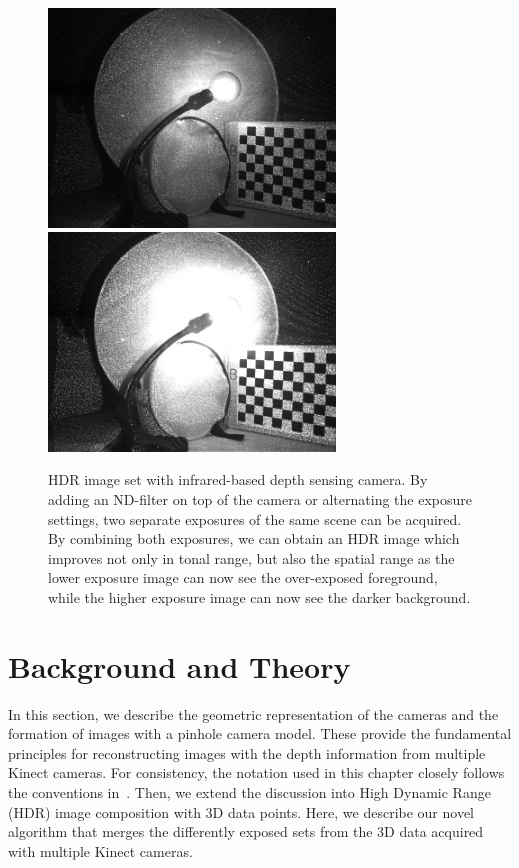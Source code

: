 \begin{figure}
\centering
\includegraphics[width=3.0in]{ch4/diagrams/low_expo_light.jpg} 
\includegraphics[width=3.0in]{ch4/diagrams/high_expo_light.jpg} \\
\caption{HDR image set with infrared-based depth sensing camera. By adding an ND-filter on top of the camera or alternating the exposure settings, two separate exposures of the same scene can be acquired. By combining both exposures, we can obtain an HDR image which improves not only in tonal range, but also the spatial range as the lower exposure image can now see the over-exposed foreground, while the higher exposure image can now see the darker background.}
\label{fig:ir_hdr}
\end{figure}

\section{Background and Theory}
In this section, we describe the geometric representation of the cameras and the formation of images with a pinhole camera model. These provide the fundamental principles for reconstructing images with the depth information from multiple Kinect cameras.  For consistency, the notation used in this chapter closely follows the conventions in~\cite{wei1994implicit,zhang2000flexible}. Then, we extend the discussion into High Dynamic Range (HDR) image composition with 3D data points. Here, we describe our novel algorithm that merges the differently exposed sets from the 3D data acquired with multiple Kinect cameras.

